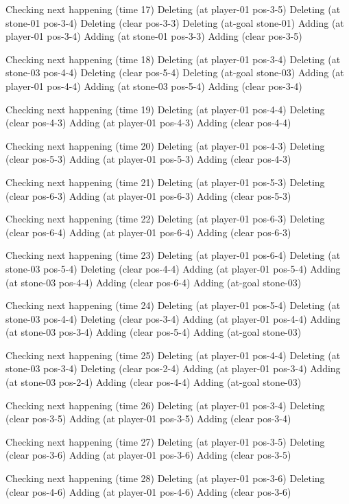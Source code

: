 Checking next happening (time 17)
Deleting (at player-01 pos-3-5)
Deleting (at stone-01 pos-3-4)
Deleting (clear pos-3-3)
Deleting (at-goal stone-01)
Adding (at player-01 pos-3-4)
Adding (at stone-01 pos-3-3)
Adding (clear pos-3-5)

Checking next happening (time 18)
Deleting (at player-01 pos-3-4)
Deleting (at stone-03 pos-4-4)
Deleting (clear pos-5-4)
Deleting (at-goal stone-03)
Adding (at player-01 pos-4-4)
Adding (at stone-03 pos-5-4)
Adding (clear pos-3-4)

Checking next happening (time 19)
Deleting (at player-01 pos-4-4)
Deleting (clear pos-4-3)
Adding (at player-01 pos-4-3)
Adding (clear pos-4-4)

Checking next happening (time 20)
Deleting (at player-01 pos-4-3)
Deleting (clear pos-5-3)
Adding (at player-01 pos-5-3)
Adding (clear pos-4-3)

Checking next happening (time 21)
Deleting (at player-01 pos-5-3)
Deleting (clear pos-6-3)
Adding (at player-01 pos-6-3)
Adding (clear pos-5-3)

Checking next happening (time 22)
Deleting (at player-01 pos-6-3)
Deleting (clear pos-6-4)
Adding (at player-01 pos-6-4)
Adding (clear pos-6-3)

Checking next happening (time 23)
Deleting (at player-01 pos-6-4)
Deleting (at stone-03 pos-5-4)
Deleting (clear pos-4-4)
Adding (at player-01 pos-5-4)
Adding (at stone-03 pos-4-4)
Adding (clear pos-6-4)
Adding (at-goal stone-03)

Checking next happening (time 24)
Deleting (at player-01 pos-5-4)
Deleting (at stone-03 pos-4-4)
Deleting (clear pos-3-4)
Adding (at player-01 pos-4-4)
Adding (at stone-03 pos-3-4)
Adding (clear pos-5-4)
Adding (at-goal stone-03)

Checking next happening (time 25)
Deleting (at player-01 pos-4-4)
Deleting (at stone-03 pos-3-4)
Deleting (clear pos-2-4)
Adding (at player-01 pos-3-4)
Adding (at stone-03 pos-2-4)
Adding (clear pos-4-4)
Adding (at-goal stone-03)

Checking next happening (time 26)
Deleting (at player-01 pos-3-4)
Deleting (clear pos-3-5)
Adding (at player-01 pos-3-5)
Adding (clear pos-3-4)

Checking next happening (time 27)
Deleting (at player-01 pos-3-5)
Deleting (clear pos-3-6)
Adding (at player-01 pos-3-6)
Adding (clear pos-3-5)

Checking next happening (time 28)
Deleting (at player-01 pos-3-6)
Deleting (clear pos-4-6)
Adding (at player-01 pos-4-6)
Adding (clear pos-3-6)

